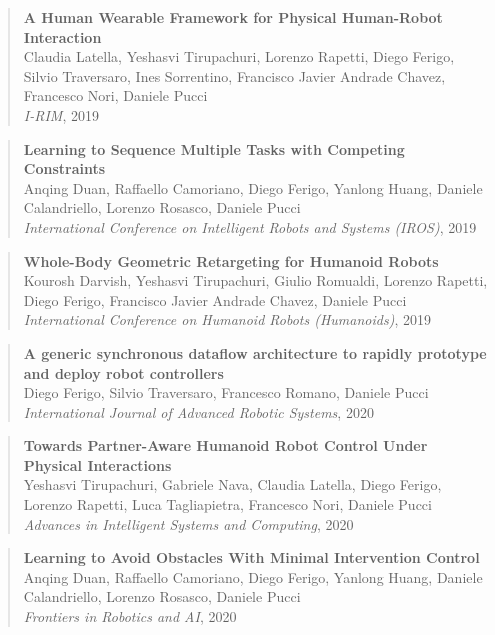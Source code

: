 \begin{quote}
    \textbf{A Human Wearable Framework for Physical Human-Robot Interaction} \\
     Claudia Latella, Yeshasvi Tirupachuri, Lorenzo Rapetti, Diego Ferigo, Silvio Traversaro, Ines Sorrentino, Francisco Javier Andrade Chavez, Francesco Nori, Daniele Pucci \\
    \textit{I-RIM}, 2019
\end{quote}

\begin{quote}
    \textbf{Learning to Sequence Multiple Tasks with Competing Constraints} \\
     Anqing Duan, Raffaello Camoriano, Diego Ferigo, Yanlong Huang, Daniele Calandriello, Lorenzo Rosasco, Daniele Pucci \\
    \textit{International Conference on Intelligent Robots and
Systems (IROS)}, 2019
\end{quote}

\begin{quote}
    \textbf{Whole-Body Geometric Retargeting for Humanoid Robots} \\
    Kourosh Darvish, Yeshasvi Tirupachuri, Giulio Romualdi, Lorenzo Rapetti, Diego Ferigo, Francisco Javier Andrade Chavez, Daniele Pucci \\
    \textit{International
Conference on Humanoid Robots (Humanoids)}, 2019
\end{quote}

\begin{quote}
    \textbf{A generic synchronous dataflow architecture to rapidly prototype and deploy robot controllers} \\
    Diego Ferigo, Silvio Traversaro, Francesco Romano, Daniele Pucci \\
    \textit{International Journal of Advanced Robotic Systems}, 2020
\end{quote}

\newpage
\begin{quote}
    \textbf{Towards Partner-Aware Humanoid Robot Control Under Physical Interactions} \\
    Yeshasvi Tirupachuri, Gabriele Nava, Claudia Latella, Diego Ferigo, Lorenzo Rapetti, Luca Tagliapietra, Francesco Nori, Daniele Pucci \\
    \textit{Advances in Intelligent Systems and Computing}, 2020
\end{quote}

\begin{quote}
    \textbf{Learning to Avoid Obstacles With Minimal Intervention Control} \\
    Anqing Duan, Raffaello Camoriano, Diego Ferigo, Yanlong Huang, Daniele Calandriello, Lorenzo Rosasco, Daniele Pucci \\
    \textit{Frontiers in Robotics and AI}, 2020
\end{quote}

